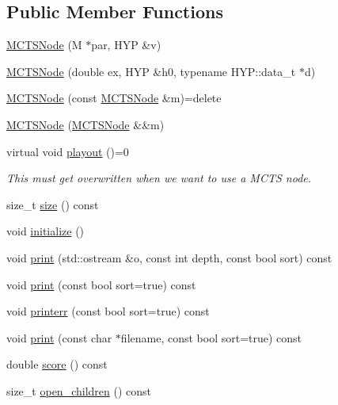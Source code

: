 \subsection*{Public Member Functions}
\begin{DoxyCompactItemize}
\item 
\hyperlink{class_m_c_t_s_node_a94e679ddbb9f4eeaaa45b6214889f47c}{M\+C\+T\+S\+Node} (M $\ast$par, H\+YP \&v)
\item 
\hyperlink{class_m_c_t_s_node_a060826eaa8052beac2adf61c53916040}{M\+C\+T\+S\+Node} (double ex, H\+YP \&h0, typename H\+Y\+P\+::data\+\_\+t $\ast$d)
\item 
\hyperlink{class_m_c_t_s_node_aaa84f65b021fd06667185b4b9c5931e6}{M\+C\+T\+S\+Node} (const \hyperlink{class_m_c_t_s_node}{M\+C\+T\+S\+Node} \&m)=delete
\item 
\hyperlink{class_m_c_t_s_node_acf0c6f2110d0acb7dd1a281d3138056d}{M\+C\+T\+S\+Node} (\hyperlink{class_m_c_t_s_node}{M\+C\+T\+S\+Node} \&\&m)
\item 
virtual void \hyperlink{class_m_c_t_s_node_a9b98535db702f0e9ee221615bd658214}{playout} ()=0
\begin{DoxyCompactList}\small\item\em This must get overwritten when we want to use a M\+C\+TS node. \end{DoxyCompactList}\item 
size\+\_\+t \hyperlink{class_m_c_t_s_node_a7996e64e69b1fc705c4e21b4a6e41c39}{size} () const
\item 
void \hyperlink{class_m_c_t_s_node_aadbe8d42f6761eb3e4f28fb9157a873d}{initialize} ()
\item 
void \hyperlink{class_m_c_t_s_node_ab4d95f5a7a753b39d30771b4e385a934}{print} (std\+::ostream \&o, const int depth, const bool sort) const
\item 
void \hyperlink{class_m_c_t_s_node_ad82ca09e761b18033a2418c3f564151f}{print} (const bool sort=true) const
\item 
void \hyperlink{class_m_c_t_s_node_a258317ddcd07a57a34a9a2eeec6f10b9}{printerr} (const bool sort=true) const
\item 
void \hyperlink{class_m_c_t_s_node_ae0d17485c455b8d7e4fa9ee1a179d631}{print} (const char $\ast$filename, const bool sort=true) const
\item 
double \hyperlink{class_m_c_t_s_node_a1a051c22b8821704a10bf33dbd426c4d}{score} () const
\item 
size\+\_\+t \hyperlink{class_m_c_t_s_node_a40ca22fadfb24bed0ccbd15d3958c674}{open\+\_\+children} () const

\end{DoxyCompactItemize}

